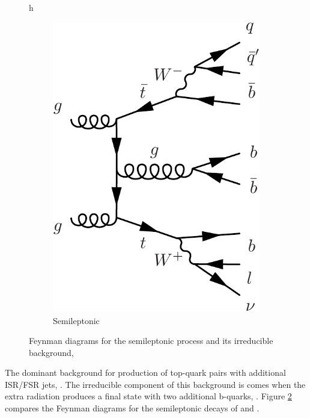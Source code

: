 \begin{figure}{h}
\begin{subfigure}[h]{0.4\textwidth}
        \includegraphics[width=\textwidth]{Figures/Feynman_Diagrams/backgrounds__ttbar_plus_bbar_semileptonic.pdf}
        \caption{Semileptonic \ttbb}\label{fig:higgs_production_vbf}
      \end{subfigure}
      \caption{Feynman diagrams for the semileptonic \ttH process and
        its irreducible background, \ttbb } \label{fig:feynman_diagrams__tth_vs_ttbb_semilep}
\end{figure}

\par The dominant background for \ttH production of top-quark pairs
with additional ISR/FSR jets, \ttjets.  The irreducible component of
this background is comes when the extra radiation produces a final
state with two additional b-quarks, \ttbb.  Figure
\ref{fig:feynman_diagrams__tth_vs_ttbb_semilep} compares the Feynman
diagrams for the semileptonic decays of \ttH and \ttbb.  

